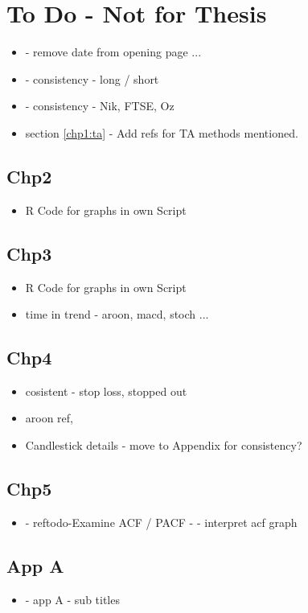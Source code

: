 
\chapter{To Do - Not for Thesis} %

\label{Chapter7} %



\begin{itemize}
\item - remove date from opening page ...
\item - consistency - long / short
\item - consistency - Nik, FTSE, Oz
\item section \ref{chp1:ta} - Add refs for TA methods mentioned.
\end{itemize}

\section{Chp2}
\begin{itemize}
\item R Code for graphs in own Script
\end{itemize}

\section{Chp3}
\begin{itemize}
\item R Code for graphs in own Script
\item time in trend - aroon, macd, stoch ...
\end{itemize}

\section{Chp4}
\begin{itemize}
\item cosistent - stop loss, stopped out
\item aroon ref, 
\item Candlestick details - move to Appendix for consistency?
\end{itemize}

\section{Chp5}
\begin{itemize}
\item - ref{todo-Examine ACF / PACF} - - interpret acf graph
\end{itemize}

\section{App A}
\begin{itemize}
\item - app A - sub titles
\end{itemize}


